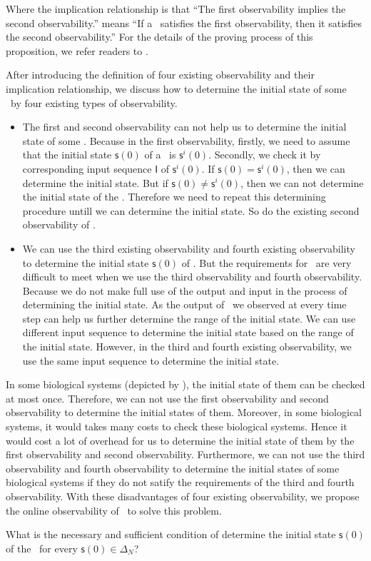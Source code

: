 Where the implication relationship is that ``The first observability implies the second observability.'' means ``If a \BCN\ satisfies the first observability, then it satisfies the second observability.'' For the details of the proving process of this proposition, we refer readers to \cite{Zhang2016Observability}.
   
After introducing the definition of four existing observability and their implication relationship, we discuss how to determine the initial state of some \BCNs\ by four existing types of observability. 
\begin{itemize}
\item The first and second observability can not help us to determine the initial state of some \BCNs. Because in the first observability, firstly, we need to assume that the initial state $\mathsf{s}(0)$ of a \BCN\ is $\mathsf{s}^{i}(0)$. Secondly, we check it by corresponding input sequence $\mathsf{I}$ of $\mathsf{s}^{i}(0)$. If $\mathsf{s}(0)=\mathsf{s}^{i}(0)$, then we can determine the initial state. But if $\mathsf{s}(0)\ne \mathsf{s}^{i}(0)$, then we can not determine the initial state of the \BCN. Therefore we need to repeat this determining procedure untill we can determine the initial state. %
So do the existing second observability of \BCNs.
\item We can use the third existing observability and fourth existing observability to determine the initial state $\mathsf{s}(0)$ of \BCNs. But the requirements for \BCNs\ are very difficult to meet when we use the third observability and fourth observability. Because we do not make full use of the output and input in the process of determining the initial state. As the output of \BCNs\ we observed at every time step can help us further determine the range of the initial state. We can use different input sequence to determine the initial state based on the range of the initial state. However, in the third and fourth existing observability, we use the same input sequence to determine the initial state.
\end{itemize} 
 
In some biological systems (depicted by \BCNs), the initial state of them can be checked at most once. Therefore, we can not use the first observability and second observability to determine the initial states of them. Moreover, in some biological systems, it would takes many costs to check these biological systems. Hence it would cost a lot of overhead for us to determine the initial state of them by the first observability and second observability. Furthermore, we can not use the third observability and fourth observability to determine the initial states of some biological systems if they do not satify the requirements of the third and fourth observability. With these disadvantages of four existing observability, we propose the online observability of \BCNs\ to solve this problem.

 \begin{problem}
\label{pro:2}
What is the necessary and sufficient condition of determine the initial state $\mathsf{s}(0)$ of the \BCN\ for every $\mathsf{s}(0)\in\Delta_N$?
\end{problem}